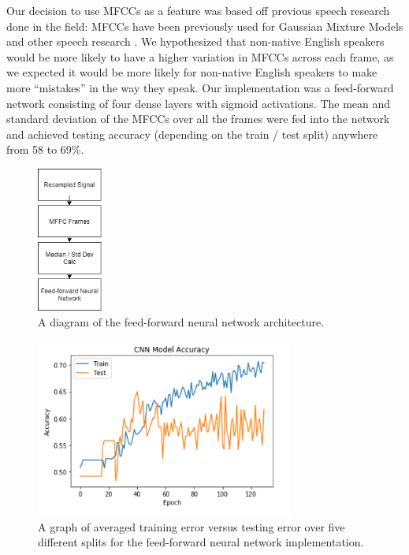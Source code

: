 \documentclass{article}
\begin{document}
Our decision to use MFCCs as a feature was based off previous speech research done in the field: MFCCs have been previously used for Gaussian Mixture Models and other speech research \cite{mfccs, chuaccent}.
We hypothesized that non-native English speakers would be more likely to have a higher variation in MFCCs across each frame, as we expected it would be more likely for non-native English speakers to make more “mistakes” in the way they speak.
Our implementation was a feed-forward network consisting of four dense layers with sigmoid activations.
The mean and standard deviation of the MFCCs over all the frames were fed into the network and achieved testing accuracy (depending on the train / test split) anywhere from 58 to 69\%.

\begin{figure}[htb]
	\centering
	\includegraphics[width = 2.15cm]{figs/ff_architecture}
	\caption{A diagram of the feed-forward neural network architecture.}
	\label{fig:ff_architecture}
\end{figure}

\begin{figure}[htb]
	\centering
	\includegraphics[width = 8.5cm]{figs/ff_graph}
	\caption{A graph of averaged training error versus testing error over five different splits for the feed-forward neural network implementation.}
	\label{fig:ff_graph}
\end{figure}
\end{document}
